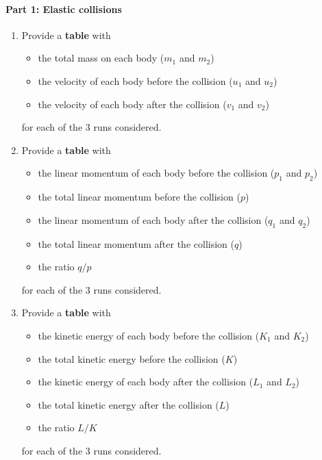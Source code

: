 \paragraph{Part 1: Elastic collisions}
%
\begin{enumerate}
    \item Provide a \textbf{table} with
    \begin{itemize}
        \item the total mass on each body ($m_{1}$ and $m_{2}$)
        \item the velocity of each body before the collision ($u_{1}$ and $u_{2}$)
        \item the velocity of each body after the collision ($v_{1}$ and $v_{2}$)
    \end{itemize}
    for each of the 3 runs considered.
    \item Provide a \textbf{table} with
    \begin{itemize}
        \item the linear momentum of each body before the collision ($p_{1}$ and $p_{2}$)
        \item the total linear momentum before the collision ($p$)
        \item the linear momentum of each body after the collision ($q_{1}$ and $q_{2}$)
        \item the total linear momentum after the collision ($q$)
        \item the ratio $q/p$
    \end{itemize}
    for each of the 3 runs considered.
    \item Provide a \textbf{table} with
    \begin{itemize}
        \item the kinetic energy of each body before the collision ($K_{1}$ and $K_{2}$)
        \item the total kinetic energy before the collision ($K$)
        \item the kinetic energy of each body after the collision ($L_{1}$ and $L_{2}$)
        \item the total kinetic energy after the collision ($L$)
        \item the ratio $L/K$
    \end{itemize}
    for each of the 3 runs considered.
\end{enumerate}
%
